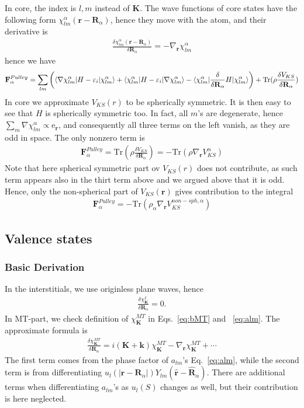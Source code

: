\documentclass[aps,prb,floatfix,epsfig,singlecolumn,showpacs,preprintnumbers]{revtex4}
\newcommand{\vR}{{\mathbf{R}}}
\newcommand{\vF}{{\mathbf{F}}}
\renewcommand{\vr}{{\mathbf{r}}}
\newcommand{\vk}{{\mathbf{k}}}
\newcommand{\vK}{{\mathbf{K}}}
\newcommand{\Tr}{\mathrm{Tr}}
\begin{document}
In core, the index is $l,m$ instead of $\vK$.  The wave functions of 
core states have the following form $\chi^\alpha_{lm}(\vr-\vR_\alpha)$, hence
they move with the atom, and their derivative is
\begin{eqnarray}
\frac{\delta \chi^\alpha_{lm}(\vr-\vR_\alpha)}{\delta\vR_\alpha}=-\nabla_\vr \chi^\alpha_{lm}
\end{eqnarray}
hence we have
\begin{eqnarray}
\vF^{Pulley}_\alpha = \sum_{lm}
\left(
\braket{\nabla\chi^\alpha_{lm}  |H-\varepsilon_i|\chi^\alpha_{lm}}+
\braket{\chi^\alpha_{lm}|H-\varepsilon_i|\nabla\chi^\alpha_{lm}}-
\braket{\chi^\alpha_{lm}|\frac{\delta}{\delta\vR_\alpha} H|\chi^\alpha_{lm}}\right)
+\Tr(\rho \frac{\delta V_{KS}}{\delta\vR_\alpha})
\end{eqnarray}
In core we approximate $V_{KS}(r)$ to be spherically symmetric. It is
then easy to see that $H$ is spherically symmetric too. In fact, all
$m$'s are degenerate, hence $\sum_m \nabla \chi_{lm}^\alpha\propto
\textrm{e}_\vr$, and consequently all three terms on the left vanish,
as they are odd in space. The only nonzero term is
\begin{eqnarray}
\vF^{Pulley}_\alpha =\Tr(\rho \frac{\delta  V_{KS}}{\delta\vR_\alpha})=-\Tr(\rho \nabla_\vr V_{KS}^\alpha)
\end{eqnarray}
Note that here spherical symmetric  part ov $V_{KS}(r)$ does not
contribute, as such term appears also in the thirt term above and we
argued above that it is odd. Hence, only the non-spherical part of
$V_{KS}(\vr)$ gives contribution to the integral
\begin{eqnarray}
\vF^{Pulley}_\alpha =-\Tr(\rho_\alpha \nabla_\vr V_{KS}^{non-sph,\alpha})
\end{eqnarray}





\subsection{Valence states}


\subsubsection{Basic Derivation}

In the interstitials, we use originless plane waves, hence
\begin{eqnarray}
\frac{\delta\chi^{I}_{\vK}}{\delta \vR_\alpha}=0.
\end{eqnarray}
In MT-part, we check definition of $\chi_{\vK}^{MT}$ in
Eqs.~\ref{eq:bMT} and ~\ref{eq:alm}.
The approximate formula is
\begin{eqnarray}
\frac{\delta\chi^{MT}_{\vK}}{\delta \vR_\alpha}=i(\vK+\vk)\chi^{MT}_{\vK}-\nabla_\vr\chi^{MT}_\vK+\cdots
\end{eqnarray}
The first term comes from the phase factor of $a_{lm}$'s
Eq.~\ref{eq:alm}, while the second term is from differentiating $u_l(|\vr-\vR_\alpha|) Y_{lm}(\hat{\vr}-\hat{\vR}_\alpha)$.
There are additional terms when differentiating $a_{lm}$'s as $u_l(S)$
changes as well, but their contribution is here neglected.
\end{document}
